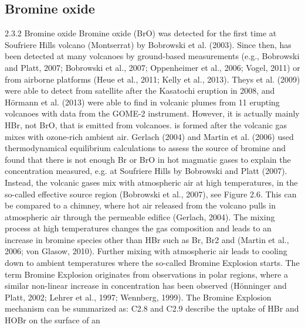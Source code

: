 \documentclass  [
  paper    = a4,
  BCOR     = 10mm,
  twoside,
  fontsize = 12pt,
  fleqn,
  toc      = bibnumbered,
  toc      = listofnumbered,
  numbers  = noendperiod,
  headings = normal,
  listof   = leveldown,
  version  = 3.03
]                                       {scrreprt}
\begin{document}
	\subsection{Bromine oxide}
		2.3.2 Bromine oxide
	Bromine oxide (BrO) was detected for the first time at Soufriere Hills volcano
	(Montserrat) by Bobrowski et al. (2003). Since then,  has been detected
	at many volcanoes by ground-based measurements (e.g., Bobrowski and Platt,
	2007; Bobrowski et al., 2007; Oppenheimer et al., 2006; Vogel, 2011) or from
	airborne platforms (Heue et al., 2011; Kelly et al., 2013). Theys et al. (2009)
	were able to detect  from satellite after the Kasatochi eruption in 2008, and
	Hörmann et al. (2013) were able to find  in volcanic plumes from 11 erupting
	volcanoes with data from the GOME-2 instrument.
	However, it is actually mainly HBr, not BrO, that is emitted from volcanoes.
	 is formed after the volcanic gas mixes with ozone-rich ambient air. Gerlach
	(2004) and Martin et al. (2006) used thermodynamical equilibrium calculations
	to assess the source of bromine and found that there is not enough Br or BrO
	in hot magmatic gases to explain the  concentration measured, e.g. at
	Soufriere Hills by Bobrowski and Platt (2007). Instead, the volcanic gases mix
	with atmospheric air at high temperatures, in the so-called effective source region
	(Bobrowski et al., 2007), see Figure 2.6. This can be compared to a chimney,
	where hot air released from the volcano pulls in atmospheric air through the
	permeable edifice (Gerlach, 2004). The mixing process at high temperatures
 changes the gas composition and leads to an increase in bromine
	species other than HBr such as Br, Br2 and  (Martin et al., 2006; von Glasow,
	2010). Further mixing with atmospheric air leads to cooling down to ambient
	temperatures where the so-called Bromine Explosion starts. The term Bromine
	Explosion originates from  observations in polar regions, where a similar
	non-linear increase in  concentration has been observed (Hönninger and
	Platt, 2002; Lehrer et al., 1997; Wennberg, 1999).
	The Bromine Explosion mechanism can be summarized as:
	C2.8 and C2.9 describe the uptake of HBr and HOBr on the surface of an
\end{document}
